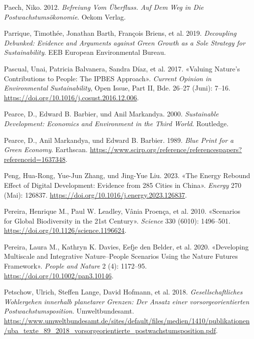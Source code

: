 \documentclass[
  nswissgerman,
  a4paper,
  DIV=11,
  numbers=noendperiod,
  oneside,
  openany]{scrreprt}
\newlength{\cslhangindent}
\newenvironment{CSLReferences}[2] %
 {\begin{list}{}{%
  \setlength{\itemindent}{0pt}
  \setlength{\leftmargin}{0pt}
  \setlength{\parsep}{0pt}
  \ifodd #1
   \setlength{\leftmargin}{\cslhangindent}
   \setlength{\itemindent}{-1\cslhangindent}
  \fi
  \setlength{\itemsep}{#2\baselineskip}}}
 {\end{list}}
\begin{document}
\begin{CSLReferences}{1}{1}
Paech, Niko. 2012. \emph{Befreiung Vom {{Ü}berfluss}. {Auf} Dem {Weg} in
Die {Postwachstums{ö}konomie}}. Oekom Verlag.

Parrique, Timothée, Jonathan Barth, François Briens, et al. 2019.
\emph{Decoupling Debunked: {Evidence} and Arguments against Green Growth
as a Sole Strategy for Sustainability}. EEB European Environmental
Bureau.

{Pascual, Unai, Patricia Balvanera, Sandra Díaz, et al.} 2017. {«Valuing
Nature's Contributions to People: The {IPBES} Approach»}. \emph{Current
Opinion in Environmental Sustainability}, Open Issue, Part {II}, Bde.
26--27 (Juni): 7--16.
\url{https://doi.org/10.1016/j.cosust.2016.12.006}.

Pearce, D., Edward B. Barbier, und Anil Markandya. 2000.
\emph{Sustainable {Development}: {Economics} and {Environment} in the
{Third World}}. Routledge.

Pearce, D., Anil Markandya, und Edward B. Barbier. 1989. \emph{Blue
{Print} for a {Green} {Economy}}. Earthscan.
\url{https://www.scirp.org/reference/referencespapers?referenceid=1637348}.

Peng, Hua-Rong, Yue-Jun Zhang, und Jing-Yue Liu. 2023. {«The Energy
Rebound Effect of Digital Development: {Evidence} from 285 Cities in
{China}»}. \emph{Energy} 270 (Mai): 126837.
\url{https://doi.org/10.1016/j.energy.2023.126837}.

Pereira, Henrique M., Paul W. Leadley, Vânia Proença, et al. 2010.
{«Scenarios for {Global} {Biodiversity} in the 21st {Century}»}.
\emph{Science} 330 (6010): 1496--501.
\url{https://doi.org/10.1126/science.1196624}.

{Pereira, Laura M., Kathryn K. Davies, Eefje den Belder, et al.} 2020.
{«Developing Multiscale and Integrative Nature--People Scenarios Using
the {Nature Futures Framework}»}. \emph{People and Nature} 2 (4):
1172--95. \url{https://doi.org/10.1002/pan3.10146}.

Petschow, Ulrich, Steffen Lange, David Hofmann, et al. 2018.
\emph{Gesellschaftliches {Wohlergehen} innerhalb planetarer {Grenzen}:
{Der} {Ansatz} einer vorsorgeorientierten {Postwachstumsposition}}.
Umweltbundesamt.
\url{https://www.umweltbundesamt.de/sites/default/files/medien/1410/publikationen/uba_texte_89_2018_vorsorgeorientierte_postwachstumsposition.pdf}.


\end{CSLReferences}
\end{document}
